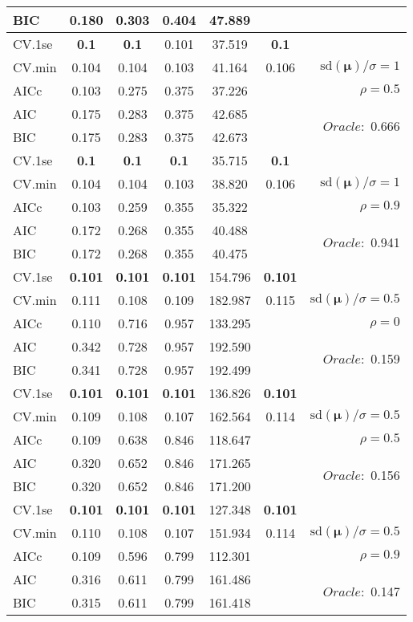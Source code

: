 \begin{table}
\begin{center}
\begin{tabular}{l*{5}{c}|r}
BIC & 0.180 & 0.303 & 0.404 & 47.889 & &  \\
 \hline 
CV.1se & {\bf 0.1} & {\bf 0.1} & 0.101 & 37.519 & {\bf 0.1} & \\
CV.min & 0.104 & 0.104 & 0.103 & 41.164 & 0.106 &  $\mathrm{sd}(\mathbf{\mu})/\sigma=1$ \\
AICc & 0.103 & 0.275 & 0.375 & 37.226 & & $\rho=0.5$ \\
AIC & 0.175 & 0.283 & 0.375 & 42.685 & &  \multirow{2}{*}{$Oracle: $ 0.666} \\
BIC & 0.175 & 0.283 & 0.375 & 42.673 & &  \\
 \hline 
CV.1se & {\bf 0.1} & {\bf 0.1} & {\bf 0.1} & 35.715 & {\bf 0.1} & \\
CV.min & 0.104 & 0.104 & 0.103 & 38.820 & 0.106 &  $\mathrm{sd}(\mathbf{\mu})/\sigma=1$ \\
AICc & 0.103 & 0.259 & 0.355 & 35.322 & & $\rho=0.9$ \\
AIC & 0.172 & 0.268 & 0.355 & 40.488 & &  \multirow{2}{*}{$Oracle: $ 0.941} \\
BIC & 0.172 & 0.268 & 0.355 & 40.475 & &  \\
 \hline 
CV.1se & {\bf 0.101} & {\bf 0.101} & {\bf 0.101} & 154.796 & {\bf 0.101} & \\
CV.min & 0.111 & 0.108 & 0.109 & 182.987 & 0.115 &  $\mathrm{sd}(\mathbf{\mu})/\sigma=0.5$ \\
AICc & 0.110 & 0.716 & 0.957 & 133.295 & & $\rho=0$ \\
AIC & 0.342 & 0.728 & 0.957 & 192.590 & &  \multirow{2}{*}{$Oracle: $ 0.159} \\
BIC & 0.341 & 0.728 & 0.957 & 192.499 & &  \\
 \hline 
CV.1se & {\bf 0.101} & {\bf 0.101} & {\bf 0.101} & 136.826 & {\bf 0.101} & \\
CV.min & 0.109 & 0.108 & 0.107 & 162.564 & 0.114 &  $\mathrm{sd}(\mathbf{\mu})/\sigma=0.5$ \\
AICc & 0.109 & 0.638 & 0.846 & 118.647 & & $\rho=0.5$ \\
AIC & 0.320 & 0.652 & 0.846 & 171.265 & &  \multirow{2}{*}{$Oracle: $ 0.156} \\
BIC & 0.320 & 0.652 & 0.846 & 171.200 & &  \\
 \hline 
CV.1se & {\bf 0.101} & {\bf 0.101} & {\bf 0.101} & 127.348 & {\bf 0.101} & \\
CV.min & 0.110 & 0.108 & 0.107 & 151.934 & 0.114 &  $\mathrm{sd}(\mathbf{\mu})/\sigma=0.5$ \\
AICc & 0.109 & 0.596 & 0.799 & 112.301 & & $\rho=0.9$ \\
AIC & 0.316 & 0.611 & 0.799 & 161.486 & &  \multirow{2}{*}{$Oracle: $ 0.147} \\
BIC & 0.315 & 0.611 & 0.799 & 161.418 & &  \\
 \hline 
\end{tabular}
\end{center}
\vspace{-1cm}
\end{table}




